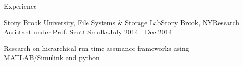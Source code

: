 \documentclass{resume} %
\begin{document}
\begin{rSection}{Experience}

\begin{rSubsection}{Stony Brook University, File Systems \& Storage Lab}{Stony Brook, NY}{Research Assistant under Prof. Scott Smolka}{July 2014 - Dec 2014}
\item Research on hierarchical run-time assurance frameworks using MATLAB/Simulink and python
\end{rSubsection}

\end{rSection}
\end{document}
